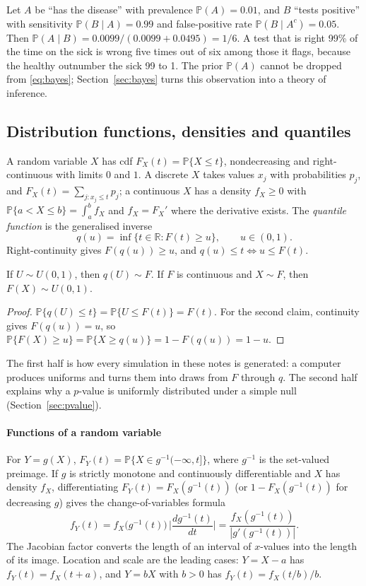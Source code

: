 \documentclass[11pt,a4paper]{article}
\renewcommand{\P}{\mathbb{P}}
\newcommand{\R}{\mathbb{R}}
\begin{document}
\begin{example}
Let $A$ be ``has the disease'' with prevalence $\P(A)=0.01$, and $B$ ``tests positive'' with sensitivity $\P(B\mid A)=0.99$ and false-positive rate $\P(B\mid A^c)=0.05$. Then $\P(A\mid B)=0.0099/(0.0099+0.0495)=1/6$. A test that is right 99\% of the time on the sick is wrong five times out of six among those it flags, because the healthy outnumber the sick 99 to 1. The prior $\P(A)$ cannot be dropped from \eqref{eq:bayes}; Section~\ref{sec:bayes} turns this observation into a theory of inference.
\end{example}

\subsection{Distribution functions, densities and quantiles}

A random variable $X$ has cdf $F_X(t)=\P\{X\le t\}$, nondecreasing and right-continuous with limits $0$ and $1$. A discrete $X$ takes values $x_j$ with probabilities $p_j$, and $F_X(t)=\sum_{j:x_j\le t}p_j$; a continuous $X$ has a density $f_X\ge0$ with $\P\{a<X\le b\}=\int_a^bf_X$ and $f_X=F_X'$ where the derivative exists. The \emph{quantile function} is the generalised inverse
\[
q(u)=\inf\{t\in\R:F(t)\ge u\},\qquad u\in(0,1).
\]
Right-continuity gives $F(q(u))\ge u$, and $q(u)\le t\iff u\le F(t)$.

\begin{proposition}\label{prop:pit}
If $U\sim U(0,1)$, then $q(U)\sim F$. If $F$ is continuous and $X\sim F$, then $F(X)\sim U(0,1)$.
\end{proposition}

\begin{proof}
$\P\{q(U)\le t\}=\P\{U\le F(t)\}=F(t)$. For the second claim, continuity gives $F(q(u))=u$, so $\P\{F(X)\ge u\}=\P\{X\ge q(u)\}=1-F(q(u))=1-u$.
\end{proof}

The first half is how every simulation in these notes is generated: a computer produces uniforms and turns them into draws from $F$ through $q$. The second half explains why a $p$-value is uniformly distributed under a simple null (Section~\ref{sec:pvalue}).

\paragraph{Functions of a random variable}
For $Y=g(X)$, $F_Y(t)=\P\{X\in g^{-1}(-\infty,t]\}$, where $g^{-1}$ is the set-valued preimage. If $g$ is strictly monotone and continuously differentiable and $X$ has density $f_X$, differentiating $F_Y(t)=F_X(g^{-1}(t))$ (or $1-F_X(g^{-1}(t))$ for decreasing $g$) gives the change-of-variables formula
\begin{equation}\label{eq:cov}
f_Y(t)=f_X\big(g^{-1}(t)\big)\,\Big|\frac{d g^{-1}(t)}{dt}\Big|=\frac{f_X(g^{-1}(t))}{|g'(g^{-1}(t))|}.
\end{equation}
The Jacobian factor converts the length of an interval of $x$-values into the length of its image. Location and scale are the leading cases: $Y=X-a$ has $f_Y(t)=f_X(t+a)$, and $Y=bX$ with $b>0$ has $f_Y(t)=f_X(t/b)/b$.
\end{document}
